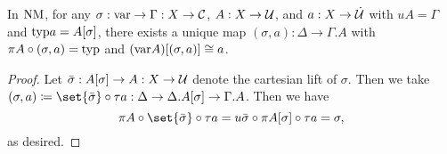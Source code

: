 \documentclass[../thesis.tex]{subfiles}
\begin{document}
\begin{proposition}
  In ${\mathrm{NM}}$, for any $\sigma : {{\mathrm{var}}} \to \Gamma : X \to {\mathcal{C}}$, $A : X \to {\mathcal{U}}$, and $a : X \to \dot{{\mathcal{U}}}$ with
  $uA = \Gamma$ and ${{\mathrm{typ}}} a = A[\sigma]$, there exists a unique map $(\sigma,a) : \Delta \to \Gamma.A$ with
  $\pi A \circ (\sigma,a) = {{\mathrm{typ}}}$ and $({{\mathrm{var}}} A)[(\sigma,a)] \cong a$.
\end{proposition}
\begin{proof}
  Let $\bar\sigma : A[\sigma] \to A : X \to {\mathcal{U}}$ denote the cartesian lift of $\sigma$. Then we take $(\sigma,a) 
  \coloneq  \set{\bar \sigma} \circ \tau a : \Delta \to \Delta.A[\sigma] \to \Gamma.A$. Then we have
  \[
    \pi A \circ \set{\bar\sigma} \circ \tau a = u\bar\sigma \circ \pi A[\sigma] \circ \tau a = \sigma,
  \]
  as desired.
\end{proof}
\end{document}
